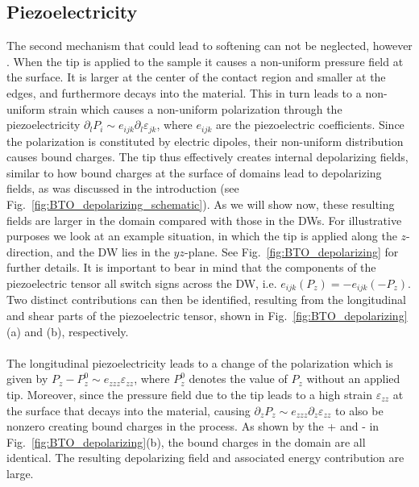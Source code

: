 \subsection{Piezoelectricity}
The second mechanism that could lead to softening can not be neglected, however \cite{Tsuji2005,Stefani2020}.
When the tip is applied to the sample it causes a non-uniform pressure field at the surface.
It is larger at the center of the contact region and smaller at the edges, and furthermore decays into the material.
This in turn leads to a non-uniform strain which causes a non-uniform polarization through the piezoelectricity $\partial_l P_i \sim e_{ijk} \partial_l \varepsilon_{jk}$, where $e_{ijk}$ are the piezoelectric coefficients.
Since the polarization is constituted by electric dipoles, their non-uniform distribution causes bound charges.
The tip thus effectively creates internal depolarizing fields, similar to how bound charges at the surface of domains lead to depolarizing fields, as was discussed in the introduction (see Fig.~\ref{fig:BTO_depolarizing_schematic}). 
As we will show now, these resulting fields are larger in the domain compared with those in the DWs.
For illustrative purposes we look at an example situation, in which the tip is applied along the $z$-direction, and the DW lies in the $yz$-plane. See Fig.~\ref{fig:BTO_depolarizing} for further details.
It is important to bear in mind that the components of the piezoelectric tensor all switch signs across the DW, i.e. $e_{ijk}(P_z) = - e_{ijk}(-P_z)$. 
Two distinct contributions can then be identified, resulting from the longitudinal and shear parts of the piezoelectric tensor, shown in Fig.~\ref{fig:BTO_depolarizing} (a) and (b), respectively.
\\\\
The longitudinal piezoelectricity leads to a change of the polarization which is given by $P_z - P^0_z \sim e_{zzz} \varepsilon_{zz}$, where $P^0_z$ denotes the value of $P_z$ without an applied tip.
Moreover, since the pressure field due to the tip leads to a high strain $\varepsilon_{zz}$ at the surface that decays into the material, causing $\partial_{z} P_z \sim e_{zzz} \partial_z \varepsilon_{zz}$ to also be nonzero creating bound charges in the process.
As shown by the + and - in Fig.~\ref{fig:BTO_depolarizing}(b), the bound charges in the domain are all identical.
The resulting depolarizing field and associated energy contribution are large.

